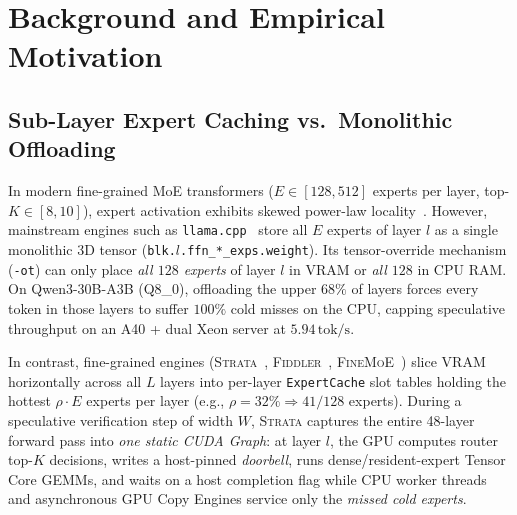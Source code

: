 \documentclass[10pt,twocolumn]{article}
\theoremstyle{definition}
\begin{document}
\section{Background and Empirical Motivation}
\label{sec:motivation}

\subsection{Sub-Layer Expert Caching vs.\ Monolithic Offloading}
In modern fine-grained MoE transformers ($E \in [128, 512]$ experts per layer, top-$K \in [8, 10]$), expert activation exhibits skewed power-law locality~\cite{song2024powerinfer,xue2024moeinfinity,strata2026}. However, mainstream engines such as \texttt{llama.cpp}~\cite{llamacpp} store all $E$ experts of layer $l$ as a single monolithic 3D tensor (\texttt{blk.$l$.ffn\_*\_exps.weight}). Its tensor-override mechanism (\texttt{-ot}) can only place \emph{all $128$ experts} of layer $l$ in VRAM or \emph{all $128$} in CPU RAM. On Qwen3-30B-A3B (Q8\_0), offloading the upper $68\%$ of layers forces every token in those layers to suffer $100\%$ cold misses on the CPU, capping speculative throughput on an A40 + dual Xeon server at $5.94\,\text{tok/s}$.

In contrast, fine-grained engines (\textsc{Strata}~\cite{strata2026}, \textsc{Fiddler}~\cite{kamahori2025fiddler}, \textsc{FineMoE}~\cite{finemoe2026}) slice VRAM horizontally across all $L$ layers into per-layer \texttt{ExpertCache} slot tables holding the hottest $\rho \cdot E$ experts per layer (e.g., $\rho = 32\% \Rightarrow 41/128$ experts). During a speculative verification step of width $W$, \textsc{Strata} captures the entire 48-layer forward pass into \emph{one static CUDA Graph}: at layer $l$, the GPU computes router top-$K$ decisions, writes a host-pinned \emph{doorbell}, runs dense/resident-expert Tensor Core GEMMs, and waits on a host completion flag while CPU worker threads and asynchronous GPU Copy Engines service only the \emph{missed cold experts}.
\end{document}
